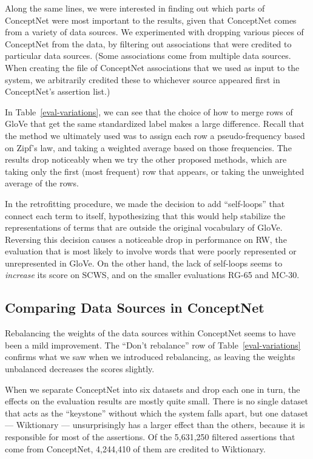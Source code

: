 \documentclass[letterpaper]{article}
\begin{document}
Along the same lines, we were interested in finding out which parts of
ConceptNet were most important to the results, given that ConceptNet comes from
a variety of data sources. We experimented with dropping various pieces of
ConceptNet from the data, by filtering out associations that were credited to
particular data sources. (Some associations come from multiple data sources.
When creating the file of ConceptNet associations that we used as input to the
system, we arbitrarily credited these to whichever source appeared first in
ConceptNet's assertion list.)


In Table~\ref{eval-variations}, we can see that the choice of how to merge rows
of GloVe that get the same standardized label makes a large difference.  Recall
that the method we ultimately used was to assign each row a pseudo-frequency
based on Zipf's law, and taking a weighted average based on those frequencies.
The results drop noticeably when we try the other proposed methods, which are
taking only the first (most frequent) row that appears, or taking the
unweighted average of the rows.

In the retrofitting procedure, we made the decision to add ``self-loops'' that
connect each term to itself, hypothesizing that this would help stabilize the
representations of terms that are outside the original vocabulary of GloVe.
Reversing this decision causes a noticeable drop in performance on RW, the
evaluation that is most likely to involve words that were poorly represented or
unrepresented in GloVe. On the other hand, the lack of self-loops seems to {\em
increase} its score on SCWS, and on the smaller evaluations RG-65 and MC-30.

\subsection{Comparing Data Sources in ConceptNet}

Rebalancing the weights of the data sources within ConceptNet seems to have
been a mild improvement. The ``Don't rebalance'' row of Table~\ref{eval-variations}
confirms what we saw when we introduced rebalancing,
as leaving the weights unbalanced decreases the scores slightly.

When we separate ConceptNet into six datasets and drop each one in turn, the
effects on the evaluation results are mostly quite small. There is no single
dataset that acts as the ``keystone'' without which the system falls apart,
but one dataset --- Wiktionary --- unsurprisingly has a larger effect than the
others, because it is responsible for most of the assertions. Of the 5,631,250
filtered assertions that come from ConceptNet, 4,244,410 of them are credited
to Wiktionary.
\end{document}
